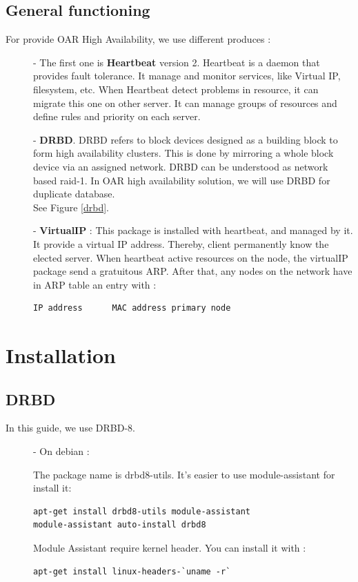 \documentclass[a4paper,10pt]{report}
\begin{document}
\section{General functioning}
For provide OAR High Availability, we use different produces :
\begin{description}
\item[]- The first one is \textbf{Heartbeat} version 2. Heartbeat is a daemon that provides fault tolerance. It manage and monitor services, like Virtual IP, filesystem, etc. When Heartbeat detect problems in resource, it can migrate this one on other server. It can manage groups of resources and define rules and priority on each server.
\item[]- \textbf{DRBD}. DRBD refers to block devices designed as a building block to form high availability clusters. This is done by mirroring a whole block device via an assigned network. DRBD can be understood as network based raid-1. In OAR high availability solution, we will use DRBD for duplicate database.\\
See Figure \ref{drbd}.
\item[]- \textbf{VirtualIP} : This package is installed with heartbeat, and managed by it. It provide a virtual IP address. Thereby, client permanently know the elected server.
When heartbeat active resources on the node, the virtualIP package send a gratuitous ARP. After that, any nodes on the network have in ARP table an entry with :
\begin{lstlisting}
IP address		MAC address primary node
\end{lstlisting}

\end{description}













\chapter{Installation}
\section{DRBD}
In this guide, we use DRBD-8.
\begin{description}
\item[]- On debian :

The package name is drbd8-utils. It's easier to use module-assistant for install it:
\begin{lstlisting}
apt-get install drbd8-utils module-assistant
module-assistant auto-install drbd8
\end{lstlisting} 



Module Assistant require kernel header. You can install it with :
\begin{lstlisting}
apt-get install linux-headers-`uname -r`
\end{lstlisting}

\end{description}
\end{document}
